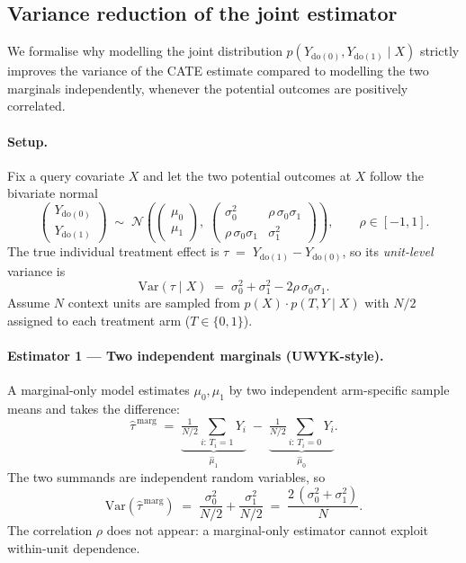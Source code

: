 \subsection{Variance reduction of the joint estimator}
\label{sec:variance-reduction}

We formalise why modelling the joint distribution
$p(Y_{\mathrm{do}(0)}, Y_{\mathrm{do}(1)} \mid X)$
strictly improves the variance of the CATE estimate compared to modelling
the two marginals independently, whenever the potential outcomes are
positively correlated.

\paragraph{Setup.}
Fix a query covariate $X$ and let the two potential outcomes at $X$ follow
the bivariate normal
\begin{equation}
\begin{pmatrix} Y_{\mathrm{do}(0)} \\ Y_{\mathrm{do}(1)} \end{pmatrix}
\;\sim\;
\mathcal{N}\!\left(\!
\begin{pmatrix} \mu_0 \\ \mu_1 \end{pmatrix},\;
\begin{pmatrix}
\sigma_0^2 & \rho\,\sigma_0\sigma_1 \\
\rho\,\sigma_0\sigma_1 & \sigma_1^2
\end{pmatrix}\!
\right),
\qquad \rho \in [-1, 1].
\label{eq:bvn-setup}
\end{equation}
The true individual treatment effect is
$\tau \;=\; Y_{\mathrm{do}(1)} - Y_{\mathrm{do}(0)}$,
so its \emph{unit-level} variance is
\begin{equation}
\mathrm{Var}(\tau \mid X) \;=\; \sigma_0^2 + \sigma_1^2 - 2\rho\,\sigma_0\sigma_1.
\label{eq:var-tau}
\end{equation}
Assume $N$ context units are sampled from $p(X)\!\cdot\!p(T,Y\mid X)$ with
$N/2$ assigned to each treatment arm ($T\in\{0,1\}$).

\paragraph{Estimator 1 --- Two independent marginals (UWYK-style).}
A marginal-only model estimates $\mu_0, \mu_1$ by two independent arm-specific
sample means and takes the difference:
\begin{equation}
\hat{\tau}^{\,\mathrm{marg}}
\;=\;
\underbrace{\tfrac{1}{N/2}\!\!\sum_{i:\,T_i=1}\!Y_i}_{\hat{\mu}_1}
\;-\;
\underbrace{\tfrac{1}{N/2}\!\!\sum_{i:\,T_i=0}\!Y_i}_{\hat{\mu}_0}.
\end{equation}
The two summands are independent random variables, so
\begin{equation}
\mathrm{Var}\!\left(\hat{\tau}^{\,\mathrm{marg}}\right)
\;=\;
\frac{\sigma_0^2}{N/2} + \frac{\sigma_1^2}{N/2}
\;=\;
\frac{2\,(\sigma_0^2 + \sigma_1^2)}{N}.
\label{eq:var-marg}
\end{equation}
The correlation $\rho$ does not appear: a marginal-only estimator cannot
exploit within-unit dependence.

